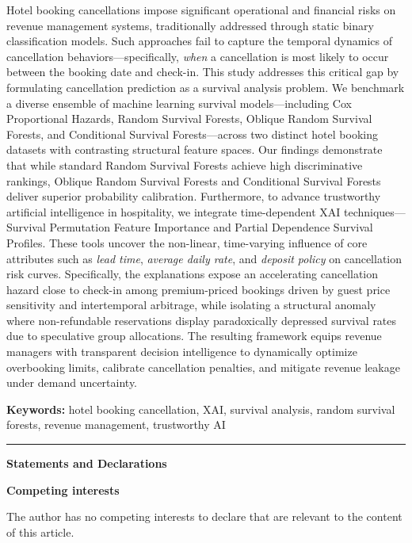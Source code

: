 \documentclass[12pt,a4paper]{article}
\begin{document}
\noindent Hotel booking cancellations impose significant operational and financial risks on revenue management systems, traditionally addressed through static binary classification models. Such approaches fail to capture the temporal dynamics of cancellation behaviors---specifically, \textit{when} a cancellation is most likely to occur between the booking date and check-in. This study addresses this critical gap by formulating cancellation prediction as a survival analysis problem. We benchmark a diverse ensemble of machine learning survival models---including Cox Proportional Hazards, Random Survival Forests, Oblique Random Survival Forests, and Conditional Survival Forests---across two distinct hotel booking datasets with contrasting structural feature spaces. Our findings demonstrate that while standard Random Survival Forests achieve high discriminative rankings, Oblique Random Survival Forests and Conditional Survival Forests deliver superior probability calibration. Furthermore, to advance trustworthy artificial intelligence in hospitality, we integrate time-dependent XAI techniques---Survival Permutation Feature Importance and Partial Dependence Survival Profiles. These tools uncover the non-linear, time-varying influence of core attributes such as \textit{lead time}, \textit{average daily rate}, and \textit{deposit policy} on cancellation risk curves. Specifically, the explanations expose an accelerating cancellation hazard close to check-in among premium-priced bookings driven by guest price sensitivity and intertemporal arbitrage, while isolating a structural anomaly where non-refundable reservations display paradoxically depressed survival rates due to speculative group allocations. The resulting framework equips revenue managers with transparent decision intelligence to dynamically optimize overbooking limits, calibrate cancellation penalties, and mitigate revenue leakage under demand uncertainty.

\vspace{1em}

\noindent \textbf{Keywords:} hotel booking cancellation, XAI, survival analysis, random survival forests, revenue management, trustworthy AI

\vspace{1em}
\hrule
\vspace{1em}

\noindent \textbf{Statements and Declarations}

\vspace{0.5em}

\noindent \textbf{Competing interests}

\noindent The author has no competing interests to declare that are relevant to the content of this article.
\end{document}
